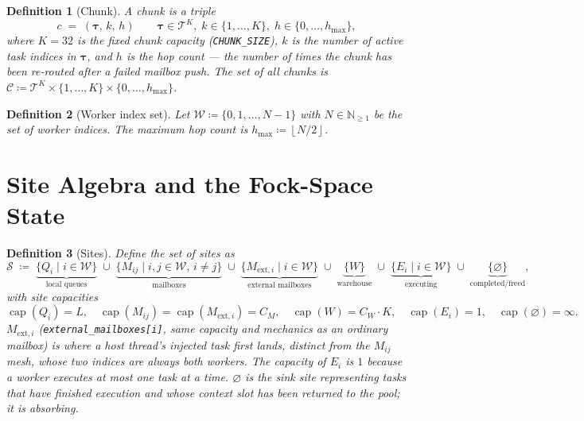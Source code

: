 \documentclass[11pt,a4paper]{report}
\newtheorem{definition}{Definition}[section]
\newcommand{\floor}[1]{\left\lfloor #1 \right\rfloor}
\newcommand{\code}[1]{\texttt{#1}}
\begin{document}
\begin{definition}[Chunk]
\label{def:chunk}
A \emph{chunk} is a triple
\[
  c \;=\; (\bm{\tau},\, k,\, h)
  \qquad
  \bm{\tau} \in \mathcal{T}^{K},\;
  k \in \{1,\ldots,K\},\;
  h \in \{0,\ldots,h_{\max}\},
\]
where $K = 32$ is the fixed chunk capacity (\code{CHUNK\_SIZE}),
$k$ is the number of active task indices in $\bm{\tau}$, and $h$ is
the \emph{hop count} --- the number of times the chunk has been
re-routed after a failed mailbox push.  The set of all chunks is
$\mathcal{C} \coloneqq \mathcal{T}^K \times \{1,\ldots,K\} \times
\{0,\ldots,h_{\max}\}$.
\end{definition}

\begin{definition}[Worker index set]
\label{def:workers}
Let $\mathcal{W} \coloneqq \{0, 1, \ldots, N-1\}$ with
$N \in \mathbb{N}_{\geq 1}$ be the set of \emph{worker indices}.
The maximum hop count is $h_{\max} \coloneqq \floor{N/2}$.
\end{definition}

\section{Site Algebra and the Fock-Space State}

\begin{definition}[Sites]
\label{def:sites}
Define the set of \emph{sites} as
\[
  \mathcal{S} \;\coloneqq\;
  \underbrace{\{Q_i \mid i \in \mathcal{W}\}}_{\text{local queues}}
  \;\cup\;
  \underbrace{\{M_{ij} \mid i,j \in \mathcal{W},\, i \neq j\}}_{\text{mailboxes}}
  \;\cup\;
  \underbrace{\{M_{\text{ext},i} \mid i \in \mathcal{W}\}}_{\text{external mailboxes}}
  \;\cup\;
  \underbrace{\{W\}}_{\text{warehouse}}
  \;\cup\;
  \underbrace{\{E_i \mid i \in \mathcal{W}\}}_{\text{executing}}
  \;\cup\;
  \underbrace{\{\varnothing\}}_{\text{completed/freed}},
\]
with site capacities
\[
  \operatorname{cap}(Q_i) = L,\quad
  \operatorname{cap}(M_{ij}) = \operatorname{cap}(M_{\text{ext},i}) = C_M,\quad
  \operatorname{cap}(W) = C_W \cdot K,\quad
  \operatorname{cap}(E_i) = 1,\quad
  \operatorname{cap}(\varnothing) = \infty.
\]
$M_{\text{ext},i}$ (\code{external\_mailboxes[i]}, same capacity and
mechanics as an ordinary mailbox) is where a host thread's injected
task first lands, distinct from the $M_{ij}$ mesh, whose two indices
are always both workers.
The capacity of $E_i$ is $1$ because a worker executes at most one
task at a time.  $\varnothing$ is the \emph{sink} site representing
tasks that have finished execution and whose context slot has been
returned to the pool; it is absorbing.
\end{definition}
\end{document}
